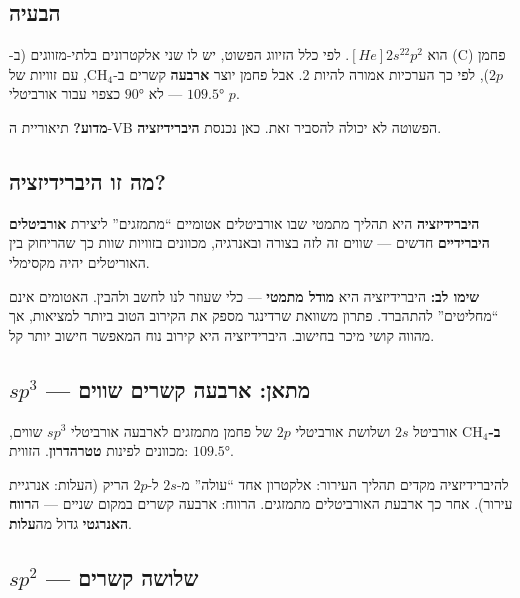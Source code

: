 \documentclass[
  hebrew,
  letterpaper,
  DIV=11,
  numbers=noendperiod]{scrreprt}
\begin{document}
\subsection{הבעיה}\label{ux5d4ux5d1ux5e2ux5d9ux5d4-1}

פחמן (\(\text{C}\)) הוא \([He]2s^22p^2\). לפי כלל הזיווג הפשוט, יש לו
שני אלקטרונים בלתי-מזווגים (ב-\(2p\)), לפי כך הערכיות אמורה להיות 2. אבל
פחמן יוצר \textbf{ארבעה} קשרים ב-\(\text{CH}_4\), עם זוויות של
\(109.5°\) --- לא \(90°\) כצפוי עבור אורביטלי \(p\).

\textbf{מדוע?} תיאוריית ה-VB הפשוטה לא יכולה להסביר זאת. כאן נכנסת
\textbf{היברידיזציה}.

\subsection{מה זו
היברידיזציה?}\label{ux5deux5d4-ux5d6ux5d5-ux5d4ux5d9ux5d1ux5e8ux5d9ux5d3ux5d9ux5d6ux5e6ux5d9ux5d4}

\textbf{היברידיזציה} היא תהליך מתמטי שבו אורביטלים אטומיים ``מתמזגים''
ליצירת \textbf{אורביטלים היברידיים} חדשים --- שווים זה לזה בצורה
ובאנרגיה, מכוונים בזוויות שוות כך שהריחוק בין האוריטלים יהיה מקסימלי.

\textbf{שימו לב:} היברידיזציה היא \textbf{מודל מתמטי} --- כלי שעוזר לנו
לחשב ולהבין. האטומים אינם ``מחליטים'' להתהברד. פתרון משוואת שרדינגר מספק
את הקירוב הטוב ביותר למציאות, אך מהווה קושי מיכר בחישוב. היברידיזציה היא
קירוב נוח המאפשר חישוב יותר קל.

\subsection{\texorpdfstring{\(sp^3\) --- מתאן: ארבעה קשרים
שווים}{sp\^{}3 --- מתאן: ארבעה קשרים שווים}}\label{sp3-ux5deux5eaux5d0ux5df-ux5d0ux5e8ux5d1ux5e2ux5d4-ux5e7ux5e9ux5e8ux5d9ux5dd-ux5e9ux5d5ux5d5ux5d9ux5dd}

\textbf{ב-\(\text{CH}_4\)} אורביטל \(2s\) ושלושת אורביטלי \(2p\) של פחמן
מתמזגים לארבעה אורביטלי \(sp^3\) שווים, מכוונים לפינות
\textbf{טטרהדרון}. הזווית: \(109.5°\).

להיברידיזציה מקדים תהליך העירור: אלקטרון אחד ``עולה'' מ-\(2s\) ל-\(2p\)
הריק (העלות: אנרגיית עירור). אחר כך ארבעת האורביטלים מתמזגים. הרווח:
ארבעה קשרים במקום שניים --- ה\textbf{רווח האנרגטי} גדול מה\textbf{עלות}.

\subsection{\texorpdfstring{\(sp^2\) --- שלושה
קשרים}{sp\^{}2 --- שלושה קשרים}}\label{sp2-ux5e9ux5dcux5d5ux5e9ux5d4-ux5e7ux5e9ux5e8ux5d9ux5dd}
\end{document}
